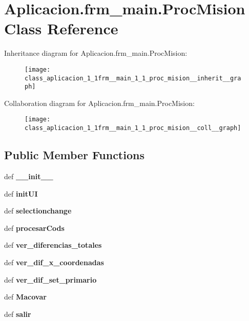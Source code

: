 \section{\-Aplicacion.\-frm\-\_\-main.\-Proc\-Mision \-Class \-Reference}
\label{class_aplicacion_1_1frm__main_1_1_proc_mision}


\-Inheritance diagram for \-Aplicacion.\-frm\-\_\-main.\-Proc\-Mision\-:\nopagebreak
\begin{figure}[H]
\begin{center}
\leavevmode
\texttt{[image: class\_aplicacion\_1\_1frm\_\_main\_1\_1\_proc\_mision\_\_inherit\_\_graph]}
\end{center}
\end{figure}


\-Collaboration diagram for \-Aplicacion.\-frm\-\_\-main.\-Proc\-Mision\-:\nopagebreak
\begin{figure}[H]
\begin{center}
\leavevmode
\texttt{[image: class\_aplicacion\_1\_1frm\_\_main\_1\_1\_proc\_mision\_\_coll\_\_graph]}
\end{center}
\end{figure}
\subsection*{\-Public \-Member \-Functions}
\begin{DoxyCompactItemize}
\item 
def {\bf \-\_\-\-\_\-init\-\_\-\-\_\-}
\item 
def {\bf init\-U\-I}
\item 
def {\bf selectionchange}
\item 
def {\bf procesar\-Cods}
\item 
def {\bf ver\-\_\-diferencias\-\_\-totales}
\item 
def {\bf ver\-\_\-dif\-\_\-x\-\_\-coordenadas}
\item 
def {\bf ver\-\_\-dif\-\_\-set\-\_\-primario}
\item 
def {\bf \-Macovar}
\item 
def {\bf salir}
\end{DoxyCompactItemize}
